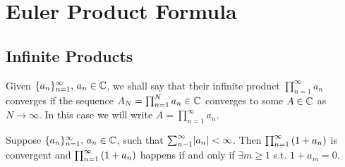 \setcounter{section}{0}
\setcounter{theorem}{0}


\section{Euler Product Formula}

\subsection{Infinite Products}
Given $\{ a_n \}_{n=1}^\infty, \, a_n \in \mathbb{C}$, we shall say that their infinite product $\prod_{n=1}^\infty a_n$ converges if the sequence $A_N = \prod_{n=1}^N a_n \in \mathbb{C}$ converges to some $A\in \mathbb{C}$ as $N \to \infty$. In this case we will write $A= \prod_{n=1}^\infty a_n$.

\begin{lemma}
Suppose $\{ a_n \}_{n=1}^\infty, \, a_n \in \mathbb{C}$, such that $\sum_{n-1}^\infty \abs{a_n} < \infty$. Then $\prod_{n=1}^\infty \left( 1+a_n \right)$ is convergent and $\prod_{n=1}^\infty \left( 1+a_n \right)$ happens if and only if $\exists m \geq 1 $ s.t. $1+a_m = 0$.
\end{lemma}

